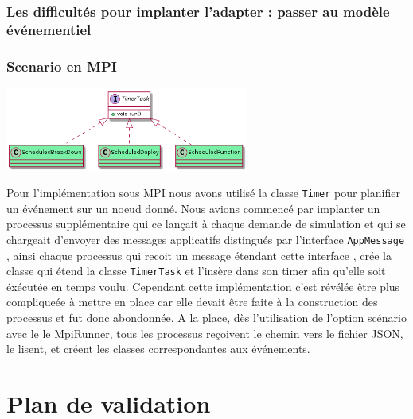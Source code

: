 \documentclass{article}
\begin{document}
				\subsubsection{Les difficultés pour implanter l'adapter : passer au modèle événementiel}
				\subsubsection{Scenario en MPI}
				\vspace{5mm}
				\hspace*{4cm} \includegraphics[width=80mm]{uml/scenMPIuml.png}
				
				\vspace{5mm}
				Pour l'implémentation sous MPI nous avons utilisé la classe \verb|Timer| pour planifier un événement sur un noeud donné.
				\newline
				Nous avions commencé par implanter un processus supplémentaire qui ce lançait à chaque demande de simulation et qui se chargeait d'envoyer des 
				messages applicatifs distingués par l'interface \verb|AppMessage| , ainsi chaque processus qui recoit un message étendant cette interface , crée la classe 
				qui étend la classe \verb|TimerTask| et l'insère dans son timer afin qu'elle soit éxécutée en temps voulu.
				\newline
				Cependant cette implémentation c'est révélée être plus compliqueée à mettre en place car elle devait être faite à la construction des processus et fut donc abondonnée.
				\newline
				A la place, dès l'utilisation de l'option scénario avec le le MpiRunner, tous les processus reçoivent le chemin vers le fichier JSON, le lisent, et créent les classes correspondantes aux événements. 
		
				
		\newpage
		\section{Plan de validation}
\end{document}
